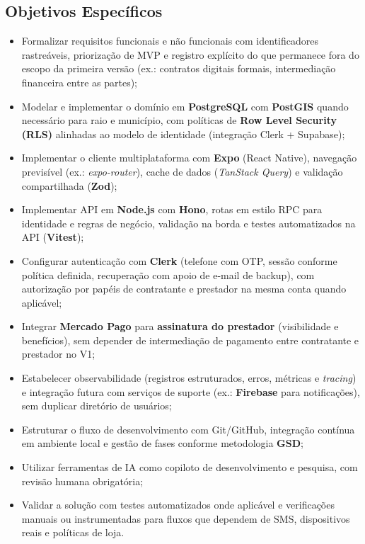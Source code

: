 \documentclass[12pt, a4paper]{article}
\begin{document}
\subsection{Objetivos Específicos}

\begin{itemize}
  \item Formalizar requisitos funcionais e não funcionais com identificadores
        rastreáveis, priorização de MVP e registro explícito do que permanece
        fora do escopo da primeira versão (ex.: contratos digitais formais,
        intermediação financeira entre as partes);
  \item Modelar e implementar o domínio em \textbf{PostgreSQL} com
        \textbf{PostGIS} quando necessário para raio e município, com
        políticas de \textbf{Row Level Security (RLS)} alinhadas ao modelo
        de identidade (integração Clerk + Supabase);
  \item Implementar o cliente multiplataforma com \textbf{Expo}
        (React Native), navegação previsível (ex.: \textit{expo-router}),
        cache de dados (\textit{TanStack Query}) e validação compartilhada
        (\textbf{Zod});
  \item Implementar API em \textbf{Node.js} com \textbf{Hono}, rotas em
        estilo RPC para identidade e regras de negócio, validação na borda
        e testes automatizados na API (\textbf{Vitest});
  \item Configurar autenticação com \textbf{Clerk} (telefone com OTP,
        sessão conforme política definida, recuperação com apoio de e-mail
        de backup), com autorização por papéis de contratante e prestador
        na mesma conta quando aplicável;
  \item Integrar \textbf{Mercado Pago} para \textbf{assinatura do
        prestador} (visibilidade e benefícios), sem depender de
        intermediação de pagamento entre contratante e prestador no V1;
  \item Estabelecer observabilidade (registros estruturados, erros,
        métricas e \textit{tracing}) e integração futura com serviços de
        suporte (ex.: \textbf{Firebase} para notificações), sem duplicar
        diretório de usuários;
  \item Estruturar o fluxo de desenvolvimento com Git/GitHub, integração
        contínua em ambiente local e gestão de fases conforme metodologia
        \textbf{GSD};
  \item Utilizar ferramentas de IA como copiloto de desenvolvimento e
        pesquisa, com revisão humana obrigatória;
  \item Validar a solução com testes automatizados onde aplicável e
        verificações manuais ou instrumentadas para fluxos que dependem de
        SMS, dispositivos reais e políticas de loja.
\end{itemize}
\end{document}
